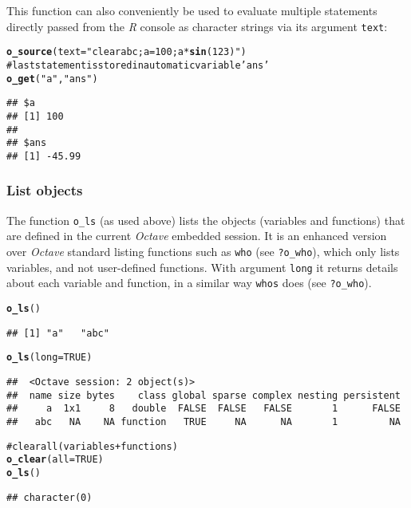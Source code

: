 \documentclass[english,10pt,a4paper]{article}\usepackage{graphicx, color}
\makeatletter
\newcommand{\hlfunctioncall}[1]{\textcolor[rgb]{0.501960784313725,0,0.329411764705882}{\textbf{#1}}}%
\newcommand{\hlstring}[1]{\textcolor[rgb]{0.6,0.6,1}{#1}}%
\newcommand{\hlcomment}[1]{\textcolor[rgb]{0.180392156862745,0.6,0.341176470588235}{#1}}%
\newenvironment{kframe}{%
 \def\at@end@of@kframe{}%
 \ifinner\ifhmode%
  \def\at@end@of@kframe{\end{minipage}}%
  \begin{minipage}{\columnwidth}%
 \fi\fi%
 \def\FrameCommand##1{\hskip\@totalleftmargin \hskip-\fboxsep
 \colorbox{shadecolor}{##1}\hskip-\fboxsep
     \hskip-\linewidth \hskip-\@totalleftmargin \hskip\columnwidth}%
 \MakeFramed {\advance\hsize-\width
   \@totalleftmargin\z@ \linewidth\hsize
   \@setminipage}}%
 {\par\unskip\endMakeFramed%
 \at@end@of@kframe}
\newenvironment{knitrout}{}{} %
\let\proglang=\textit
\let\code=\texttt
\newcommand{\R}{\proglang{R}\xspace}
\newcommand{\octave}{\proglang{Octave}\xspace}
\makeatother
\begin{document}
This function can also conveniently be used to evaluate multiple statements
directly passed from the \R console as character strings via its argument
\code{text}:

\begin{knitrout}
\color{fgcolor}\begin{kframe}
\begin{alltt}
\hlfunctioncall{o_source}(text = \hlstring{"clear a b c; a=100; a*\hlfunctioncall{sin}(123)"})
\hlcomment{# last statement is stored in automatic variable 'ans'}
\hlfunctioncall{o_get}(\hlstring{"a"}, \hlstring{"ans"})
\end{alltt}
\begin{verbatim}
## $a
## [1] 100
## 
## $ans
## [1] -45.99
\end{verbatim}
\end{kframe}
\end{knitrout}


\subsubsection{List objects}

The function \code{o\_ls} (as used above) lists the objects (variables and
functions) that are defined in the current \octave embedded session.
It is an enhanced version over \octave standard listing functions such as
\code{who} (see \code{?o\_who}), which only lists variables, and not
user-defined functions.
With argument \code{long} it returns details about each variable and function,
in a similar way \code{whos} does (see \code{?o\_who}).

\begin{knitrout}
\color{fgcolor}\begin{kframe}
\begin{alltt}
\hlfunctioncall{o_ls}()
\end{alltt}
\begin{verbatim}
## [1] "a"   "abc"
\end{verbatim}
\begin{alltt}
\hlfunctioncall{o_ls}(long = TRUE)
\end{alltt}
\begin{verbatim}
##  <Octave session: 2 object(s)>
##  name size bytes    class global sparse complex nesting persistent
##     a  1x1     8   double  FALSE  FALSE   FALSE       1      FALSE
##   abc   NA    NA function   TRUE     NA      NA       1         NA
\end{verbatim}
\begin{alltt}

\hlcomment{# clear all (variables + functions)}
\hlfunctioncall{o_clear}(all = TRUE)
\hlfunctioncall{o_ls}()
\end{alltt}
\begin{verbatim}
## character(0)
\end{verbatim}
\end{kframe}
\end{knitrout}
\end{document}
